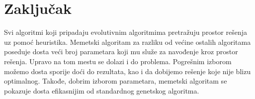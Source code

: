 \documentclass[a4paper]{article}
\begin{document}
\section{Zaključak}
\label{sec:zakljucak}

Svi algoritmi koji pripadaju evolutivnim algoritmima pretražuju prostor rešenja uz pomoć heuristika. Memetski algoritam za razliku od većine ostalih algoritama poseduje dosta veći broj parametara koji mu služe za navođenje kroz prostor rešenja. Upravo na tom mestu se dolazi i do problema. Pogrešnim izborom možemo dosta sporije doći do rezultata, kao i da dobijemo rešenje koje nije blizu optimalnog. Takođe, dobrim izborom parametara, memetski algoritam se pokazuje dosta efikasnijim od standardnog genetskog algoritma.

\appendix
 

\end{document}
